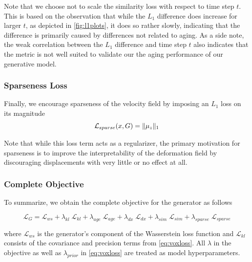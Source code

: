 Note that we choose not to scale the similarity loss with respect to time step $t$. This is based on the observation that while the $L_1$ difference does increase for larger $t$, as depicted in \autoref{fig:l1plots}, it does so rather slowly, indicating that the difference is primarily caused by differences not related to aging. As a side note, the weak correlation between the $L_1$ difference and time step $t$ also indicates that the metric is not well suited to validate our the aging performance of our generative model.

\subsubsection*{Sparseness Loss}
Finally, we encourage sparseness of the velocity field by imposing an $L_1$ loss on its magnitude
\begin{equation}
	\mathcal{L}_{sparse}( x, G ) = \lVert\mu_z\rVert_1
\end{equation}

Note that while this loss term acts as a regularizer, the primary motivation for sparseness is to improve the interpretability of the deformation field by discouraging displacements with very little or no effect at all.

\subsubsection*{Complete Objective}
To summarize, we obtain the complete objective for the generator as follows

\begin{equation}
	\mathcal{L}_G =
		\mathcal{L}_{ws} +
		\lambda_{kl} \; \mathcal{L}_{kl} +
		\lambda_{age} \; \mathcal{L}_{age} + 
		\lambda_{dx} \; \mathcal{L}_{dx} + 
		\lambda_{sim} \; \mathcal{L}_{sim} + 
		\lambda_{sparse} \; \mathcal{L}_{sparse}
\end{equation}

where $\mathcal{L}_{ws}$ is the generator's component of the Wasserstein loss function and $\mathcal{L}_{kl}$ consists of the covariance and precision terms from \autoref{eq:voxloss}. All $ \lambda $ in the objective as well as $\lambda_{prior}$ in \autoref{eq:voxloss} are treated as model hyperparameters.

